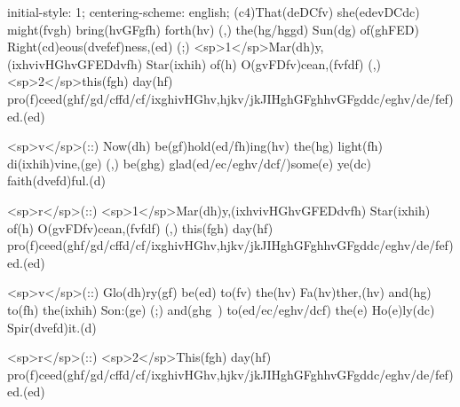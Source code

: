 initial-style: 1;
centering-scheme: english;
(c4)That(deDCfv) she(edevDCdc) might(fvgh) bring(hvGFgfh) forth(hv) (,) the(hg/hggd) Sun(dg) of(ghFED) Right(cd)eous(dvefef)ness,(ed) (;) <sp>1</sp>Mar(dh)y,(ixhvivHGhvGFEDdvfh) Star(ixhih) of(h) O(gvFDfv)cean,(fvfdf) (,) <sp>2</sp>this(fgh) day(hf) pro(f)ceed(ghf/gd/cffd/cf/ixghivHGhv,hjkv/jkJIHghGFghhvGFgddc/eghv/de/fef)ed.(ed)

<sp>v</sp>(::) Now(dh) be(gf)hold(ed/fh)ing(hv) the(hg) light(fh) di(ixhih)vine,(ge) (,) be(ghg) glad(ed/ec/eghv/dcf/)some(e) ye(dc) faith(dvefd)ful.(d)

<sp>r</sp>(::) <sp>1</sp>Mar(dh)y,(ixhvivHGhvGFEDdvfh) Star(ixhih) of(h) O(gvFDfv)cean,(fvfdf) (,) this(fgh) day(hf) pro(f)ceed(ghf/gd/cffd/cf/ixghivHGhv,hjkv/jkJIHghGFghhvGFgddc/eghv/de/fef)ed.(ed)

<sp>v</sp>(::) Glo(dh)ry(gf) be(ed) to(fv) the(hv) Fa(hv)ther,(hv) and(hg) to(fh) the(ixhih) Son:(ge) (;) and(ghg~) to(ed/ec/eghv/dcf) the(e) Ho(e)ly(dc) Spir(dvefd)it.(d)

<sp>r</sp>(::) <sp>2</sp>This(fgh) day(hf) pro(f)ceed(ghf/gd/cffd/cf/ixghivHGhv,hjkv/jkJIHghGFghhvGFgddc/eghv/de/fef)ed.(ed)